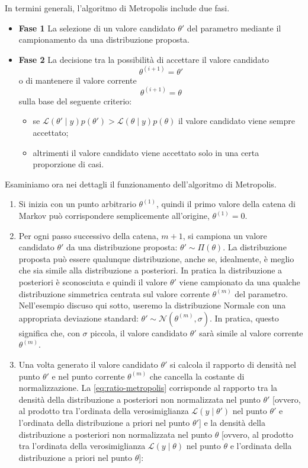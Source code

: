 \documentclass[
]{memoir}
\providecommand{\tightlist}{%
  \setlength{\itemsep}{0pt}\setlength{\parskip}{0pt}}
\begin{document}
In termini generali, l'algoritmo di Metropolis include due fasi.

\begin{itemize}
\tightlist
\item
  \textbf{Fase 1} La selezione di un valore candidato \(\theta'\) del parametro mediante il campionamento da una distribuzione proposta.
\item
  \textbf{Fase 2} La decisione tra la possibilità di accettare il valore candidato \[\theta^{(i+1)} = \theta'\] o di mantenere il valore corrente \[\theta^{(i+1)} = \theta\] sulla base del seguente criterio:

  \begin{itemize}
  \tightlist
  \item
    se \(\mathcal{L}(\theta' \mid y)p(\theta') > \mathcal{L}(\theta \mid y)p(\theta)\) il valore candidato viene sempre accettato;
  \item
    altrimenti il valore candidato viene accettato solo in una certa proporzione di casi.
  \end{itemize}
\end{itemize}

Esaminiamo ora nei dettagli il funzionamento dell'algoritmo di Metropolis.

\begin{enumerate}
\def\labelenumi{(\alph{enumi})}
\item
  Si inizia con un punto arbitrario \(\theta^{(1)}\), quindi il primo valore della catena di Markov può corrispondere semplicemente all'origine, \(\theta^{(1)} = 0\).
\item
  Per ogni passo successivo della catena, \(m + 1\), si campiona un valore candidato \(\theta'\) da una distribuzione proposta: \(\theta' \sim \Pi(\theta)\). La distribuzione proposta può essere qualunque distribuzione, anche se, idealmente, è meglio che sia simile alla distribuzione a posteriori. In pratica la distribuzione a posteriori è sconosciuta e quindi il valore \(\theta'\) viene campionato da una qualche distribuzione simmetrica centrata sul valore corrente \(\theta^{(m)}\) del parametro. Nell'esempio discuso qui sotto, useremo la distribuzione Normale con una appropriata deviazione standard: \(\theta' \sim \mathcal{N}(\theta^{(m)}, \sigma)\). In pratica, questo significa che, con \(\sigma\) piccola, il valore candidato \(\theta'\) sarà simile al valore corrente \(\theta^{(m)}\).
\item
  Una volta generato il valore candidato \(\theta'\) si calcola il rapporto di densità nel punto \(\theta'\) e nel punto corrente \(\theta^{(m)}\) che cancella la costante di normalizzazione. La \eqref{eq:ratio-metropolis} corrisponde al rapporto tra la densità della distribuzione a posteriori non normalizzata nel punto \(\theta'\) {[}ovvero, al prodotto tra l'ordinata della verosimiglianza \(\mathcal{L}(y \mid \theta')\) nel punto \(\theta'\) e l'ordinata della distribuzione a priori nel punto \(\theta'\){]} e la densità della distribuzione a posteriori non normalizzata nel punto \(\theta\) {[}ovvero, al prodotto tra l'ordinata della verosimiglianza \(\mathcal{L}(y \mid \theta)\) nel punto \(\theta\) e l'ordinata della distribuzione a priori nel punto \(\theta\){]}:
\end{enumerate}
\end{document}
